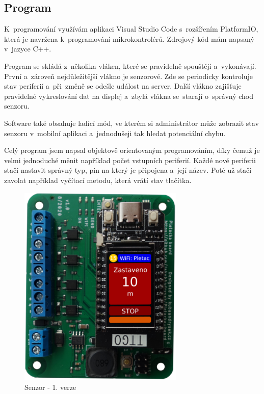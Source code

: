 \subsection{Program}
K~programování využívám aplikaci Visual Studio Code s~rozšířením PlatformIO, která je navržena k~programování mikrokontrolérů. 
Zdrojový kód mám napsaný v~jazyce C++.

Program se skládá z~několika vláken, které se pravidelně spouštějí a~vykonávají.
První a~zároveň nejdůležitější vlákno je senzorové.
Zde se periodicky kontroluje stav periferií a~při~změně se odešle událost na server.
Další vlákno zajišťuje pravidelné vykreslování dat na displej a~zbylá vlákna se~starají o~správný chod senzoru.

Software také obsahuje ladící mód, ve kterém si administrátor může zobrazit stav senzoru v~mobilní aplikaci a~jednodušeji tak hledat potenciální chybu.

Celý program jsem napsal objektově orientovaným programováním, díky čemuž je velmi jednoduché měnit například počet vstupních periferií.
Každé nové periferii stačí nastavit správný typ, pin na který je připojena a~její název.
Poté už stačí zavolat například vyčítací metodu, která vrátí stav tlačítka.
\newline
\newline

\begin{figure}[htbp]
    \centering
    \includegraphics[width=0.7\textwidth]{img/V1-deska-esp-screen.png}
    \caption{Senzor - 1. verze}
    \label{fig:SenzorV1}
\end{figure}


